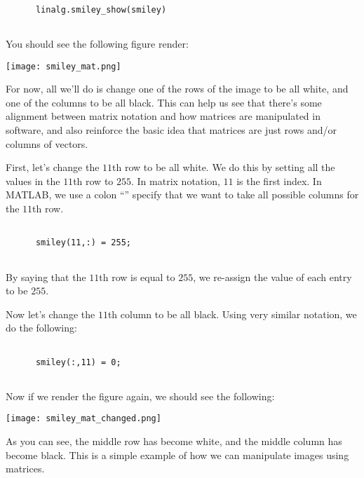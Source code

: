 \documentclass{ximera}
\begin{document}
\begin{exploration}
\begin{example}
    \begin{verbatim}
    
      linalg.smiley_show(smiley)
  
    \end{verbatim}
  
    You should see the following figure render:
  
    \begin{center}
      \texttt{[image: smiley\_mat.png]}
    \end{center}
  
    For now, all we'll do is change one of the rows of the image to be all white, and one of the columns to be all black. This can help us see that there's some alignment between matrix notation and how matrices are manipulated in software, and also reinforce the basic idea that matrices are just rows and/or columns of vectors.
  
    First, let's change the $11$th row to be all white. We do this by setting all the values in the $11$th row to $255$. In matrix notation, $11$ is the first index. In MATLAB, we use a colon ``\:'' specify that we want to take all possible columns for the $11$th row.
  
    \begin{verbatim}
    
      smiley(11,:) = 255;
  
    \end{verbatim}
  
    By saying that the $11$th row is equal to $255$, we re-assign the value of each entry to be $255$.
  
    Now let's change the $11$th column to be all black. Using very similar notation, we do the following:
  
    \begin{verbatim}
    
      smiley(:,11) = 0;
  
    \end{verbatim}
  
    Now if we render the figure again, we should see the following:
  
    \begin{center}
      \texttt{[image: smiley\_mat\_changed.png]}
    \end{center}
  
    As you can see, the middle row has become white, and the middle column has become black. This is a simple example of how we can manipulate images using matrices.
  
  \end{example}
  
  \end{exploration}
\end{document}
